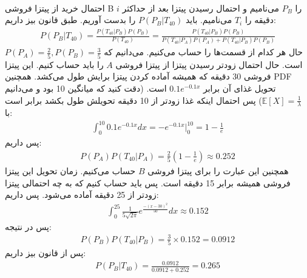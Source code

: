 \\
احتمال خرید از پیتزا فروشی B را
$P_B$
می‌نامیم و احتمال رسیدن پیتزا بعد از حداکثر
$i$
دقیقه را
$T_i$
می‌نامیم.
باید
$P(P_B|T_{40})$
را بدست آوریم.
طبق قانون بیز داریم:
\begin{gather*}
    P(P_B|T_{40}) = \frac{P(T_{40}|P_B) P(P_B)}{P(T_{40})} = \frac{P(T_{40}|P_B) P(P_B)}{P(T_{40}|P_A) P(P_A) + P(T_{40}|P_B) P(P_B)}
\end{gather*}
حال هر کدام از قسمت‌ها را حساب می‌کنیم. می‌دانیم که
$P(P_A) = \frac{2}{5}, P(P_B) = \frac{3}{5}$
است. حال احتمال زودتر رسیدن پیتزا از پیتزا فروشی
$A$
را باید حساب کنیم. این پیتزا فروشی 30 دقیقه که همیشه آماده کردن پیتزا برایش طول می‌کشد. همچنین
PDF
تحویل غذای آن برابر
$0.1e^{-0.1x}$
است.
(دقت کنید که میانگین 10 بود و می‌دانیم
$\mathbb{E} [X] = \frac{1}{\lambda}$)
پس احتمال اینکه غذا زودتر از 10 دقیقه تحویلش طول بکشد برابر است با:
\begin{gather*}
    \int_0^{10} 0.1e^{-0.1x} dx = -e^{-0.1x} \big |_0^{10} = 1 - \frac{1}{e}
\end{gather*}
پس داریم:
\begin{gather*}
    P(P_A) P(T_{40}|P_A) = \frac{2}{5} (1 - \frac{1}{e}) \approx 0.252
\end{gather*}
همچنین این عبارت را برای پیتزا فروشی
$B$
حساب می‌کنیم. زمان تحویل این پیتزا فروشی همیشه برابر 15 دقیقه است. پس باید حساب کنیم که به چه احتمالی
پیتزا زودتر از 25 دقیقه آماده می‌شود. پس داریم:
\begin{gather*}
    \int_0^{25} \frac{1}{5\sqrt{2\pi}}e^{\frac{-(x-30)^2}{50}} dx \approx 0.152
\end{gather*}
پس در نتیجه:
\begin{gather*}
    P(P_B) P(T_{40}|P_B) = \frac{3}{5} \times 0.152 = 0.0912
\end{gather*}
پس از قانون بیز داریم:
\begin{gather*}
    P(P_B|T_{40}) = \frac{0.0912}{0.0912 + 0.252} = 0.265
\end{gather*}

